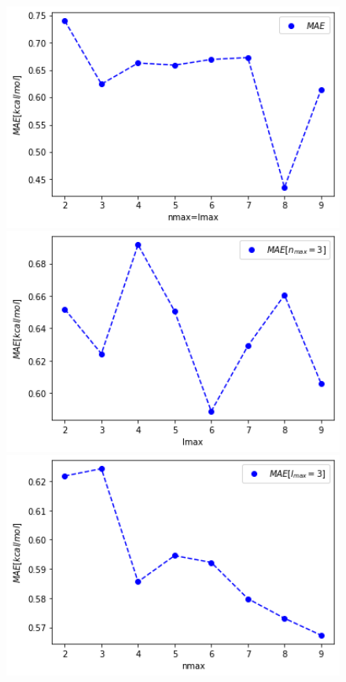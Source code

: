 \begin{figure}[!htb]
    \includegraphics[width=1.0\textwidth]{figures/regression/snap/nmaxlmax.png}
  \endminipage\hfill
    \includegraphics[width=1.0\textwidth]{figures/regression/snap/lmax.png}
  \endminipage\hfill
    \includegraphics[width=1.0\textwidth]{figures/regression/snap/nmax.png}

\end{figure}
